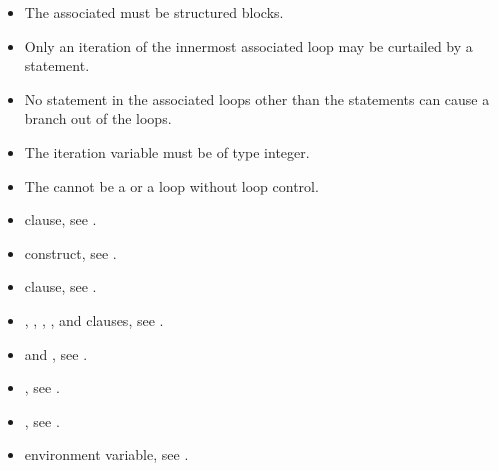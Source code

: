 \begin{fortranspecific}
\begin{itemize}
\item The associated  must be structured blocks.

\item Only an iteration of the innermost associated loop may be curtailed by a 
statement.

\item No statement in the associated loops other than the  statements can cause a branch
out of the loops.

\item The  iteration variable must be of type integer.

\item The  cannot be a  or a  loop without loop control.
\end{itemize}
\end{fortranspecific}

\crossreferences
\begin{itemize}
\item {} clause, see .

\item {} construct, see
.

\item {} clause, see
.

\item {}, , , , and  clauses, see
.

\item {} and , see
  .
\item {}, see .

\item {}, see
.

\item {} environment variable, see
.
\end{itemize}







